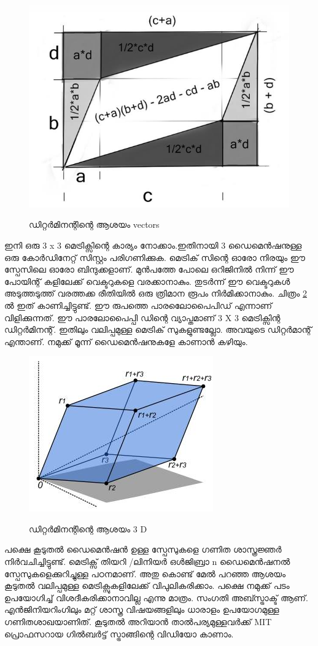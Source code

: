 \documentclass[10pt,a4paper]{report}
\begin{document}
                            
    \begin{figure}[H]
  \center
\includegraphics[scale=.4]{images/m6}
\label{mat6}
\caption{ ഡിറ്റർമിനന്റിന്റെ  ആശയം vectors }
\end{figure}
     ഇനി ഒരു 3 x 3 മെട്രിക്സിന്റെ കാര്യം നോക്കാം.ഇതിനായി 3 ഡൈമെൻഷനുള്ള ഒരു കോർഡിനേറ്റ് സിസ്റ്റം പരിഗണിക്കുക. മെട്രിക് സിന്റെ ഓരോ നിരയും ഈ സ്പേസിലെ ഓരോ ബിന്ദുക്കളാണ്. മുൻപത്തേ പോലെ ഒറിജിനിൽ നിന്ന് ഈ പോയിന്റ് കളിലേക്ക് വെക്ടറുകളെ വരക്കാനാകും. തുടർന്ന് ഈ വെക്ടറുകൾ അടുത്തടുത്ത് വരത്തക്ക രീതിയിൽ ഒരു ത്രിമാന രൂപം നിർമിക്കാനാകും. ചിത്രം \ref{mat7} ൽ ഇത് കാണിച്ചിട്ടുണ്ട്. ഈ രുപത്തെ പാരലോെപൈപിഡ് എന്നാണ് വിളിക്കുന്നത്. ഈ പാരലോപൈപ്പി ഡിന്റെ വ്യാപ്തമാണ് 3 X 3 മെട്രിക്സിന്റ ഡിറ്റർമിനന്റ്. ഇതിലും വലിപ്പമുള്ള മെട്രിക് സുകളുണ്ടല്ലോ. അവയുടെ ഡിറ്റർമാന്റ് എന്താണ്. നമുക്ക് മൂന്ന് ഡൈമെൻഷനുകളേ കാണാൻ കഴിയും. 
                                 
    \begin{figure}[H]
  \center
\includegraphics[scale=.5]{images/m7}
\label{mat7}
\caption{ ഡിറ്റർമിനന്റിന്റെ  ആശയം 3 D }
\end{figure}
     പക്ഷെ കൂടുതൽ ഡൈമെൻഷൻ ഉള്ള സ്പേസുകളെ ഗണിത ശാസ്ത്രജ്ഞർ നിർവചിച്ചിട്ടുണ്ട്. മെട്രിക്സ് തിയറി /ലിനിയർ ഒൾജിബ്രാ n ഡൈമെൻഷനൽ സ്പേസുകളെക്കുറിച്ചുള്ള പഠനമാണ്. അതു കൊണ്ട് മേൽ പറഞ്ഞ ആശയം കൂടുതൽ വലിപ്പമുള്ള മെട്രിക്സുകളിലേക്ക് വിപുലികരിക്കാം. പക്ഷെ നമുക്ക് പടം ഉപയോഗിച്ച് വിശദീകരിക്കാനാവില്ല എന്നു മാത്രം. സംഗതി അബ്സ്ട്രാക്ട് ആണ്. എൻജിനിയറിംഗിലും മറ്റ് ശാസ്ത്ര വിഷയങ്ങളിലും ധാരാളം ഉപയോഗമുള്ള ഗണിതശാഖയാണിത്. കൂടുതൽ അറിയാൻ താൽപര്യമുള്ളവർക്ക് MIT പ്രൊഫസറായ ഗിൽബർട്ട് സ്ട്രാങ്ങിന്റെ വിഡിയോ കാണാം.
     
\end{document}
